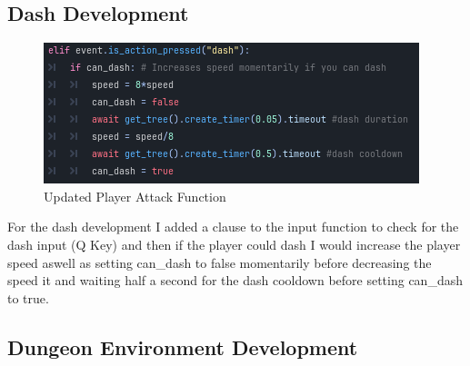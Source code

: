 \documentclass{article}
\begin{document}
        \subsection{Dash Development}
        \begin{figure}[H]
                \centering
                \includegraphics[width = 0.8\columnwidth]{images/development/Dash_script.PNG}
                \caption{Updated Player Attack Function}
        \end{figure}
        For the dash development I added a clause to the input function to check for the dash input (Q Key) and then if the player could dash I would increase the player speed aswell as setting can\_dash to false momentarily before decreasing the speed it and waiting half a second for the dash cooldown before setting can\_dash to true.\\
        \subsection{Dungeon Environment Development}
\end{document}
